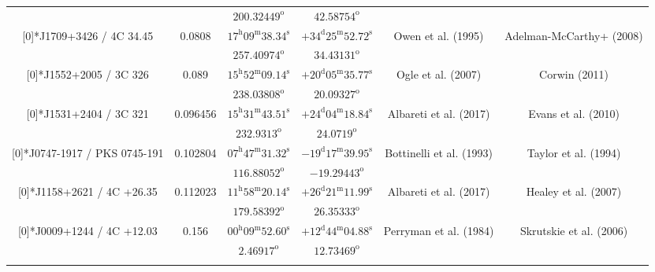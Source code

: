 \begin{landscape}
\begin{longtable}{cccccc}
    & & $200.32449^\text{o}$ & $42.58754^\text{o}$ & & \\ \addlinespace 
  \multirow{2}[0]{*}{J1709+3426 / 4C 34.45} & \multirow{2}[0]{*}{0.0808} &  
    $17^\text{h}09^\text{m}38.34^\text{s}$  & $+34^\text{d}25^\text{m}52.72^\text{s}$  & 
    \multirow{2}[0]{*}{Owen et al. (1995)\cite{RedRef106_1995}}& \multirow{2}[0]{*}{Adelman-McCarthy+ (2008) \cite{CoordRef28_2008}} \\*
    & & $257.40974 ^\text{o}$ & $34.43131^\text{o}$ & & \\ \addlinespace 
  \multirow{2}[0]{*}{J1552+2005 / 3C 326} & \multirow{2}[0]{*}{0.089} &  
    $15^\text{h}52^\text{m}09.14^\text{s}$  & $+20^\text{d}05^\text{m}35.77^\text{s}$  & 
    \multirow{2}[0]{*}{Ogle et al. (2007)\cite{RedRef107_2007}}& \multirow{2}[0]{*}{Corwin (2011) \cite{CoordRef107_2011}} \\*
    & & $238.03808^\text{o}$ & $20.09327^\text{o}$ & & \\ \addlinespace 

  \multirow{2}[0]{*}{J1531+2404 / 3C 321} & \multirow{2}[0]{*}{0.096456} &  
    $15^\text{h}31^\text{m}43.51^\text{s}$  & $+24^\text{d}04^\text{m}18.84^\text{s}$  & 
    \multirow{2}[0]{*}{Albareti et al. (2017)\cite{RedRef9_2017}}& \multirow{2}[0]{*}{Evans et al. (2010) \cite{CoordRef1_2010}} \\*
    & & $232.9313^\text{o}$ & $24.0719^\text{o}$ & & \\ \addlinespace 

  \multirow{2}[0]{*}{J0747-1917 / PKS 0745-191} & \multirow{2}[0]{*}{0.102804} &  
    $07^\text{h}47^\text{m}31.32^\text{s}$  & $-19^\text{d}17^\text{m}39.95^\text{s}$  & 
    \multirow{2}[0]{*}{Bottinelli et al. (1993)\cite{RedRef1_1993}}& \multirow{2}[0]{*}{Taylor et al. (1994) \cite{CoordRef109_1994}} \\*
    & & $116.88052^\text{o}$ & $-19.29443^\text{o}$ & & \\ \addlinespace 
  \multirow{2}[0]{*}{J1158+2621 / 4C +26.35} & \multirow{2}[0]{*}{0.112023} &  
    $11^\text{h}58^\text{m}20.14^\text{s}$  & $+26^\text{d}21^\text{m}11.99^\text{s}$  & 
    \multirow{2}[0]{*}{Albareti et al. (2017)\cite{RedRef9_2017}}& \multirow{2}[0]{*}{Healey et al. (2007) \cite{CoordRef110_2007}} \\*
    & & $179.58392^\text{o}$ & $26.35333^\text{o}$ & & \\ \addlinespace 
  \multirow{2}[0]{*}{J0009+1244 / 4C +12.03} & \multirow{2}[0]{*}{0.156} &  
    $00^\text{h}09^\text{m}52.60^\text{s}$  & $+12^\text{d}44^\text{m}04.88^\text{s}$  & 
    \multirow{2}[0]{*}{Perryman et al. (1984)\cite{RedRef111_1984}}& \multirow{2}[0]{*}{Skrutskie et al. (2006)\cite{CoordRef77_2006}} \\*
    & & $2.46917^\text{o}$ & $12.73469^\text{o}$ & & \\ \addlinespace 


\end{longtable}
\end{landscape}
